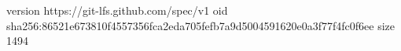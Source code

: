version https://git-lfs.github.com/spec/v1
oid sha256:86521e673810f4557356fca2eda705fefb7a9d5004591620e0a3f77f4fc0f6ee
size 1494
